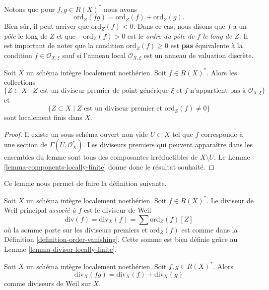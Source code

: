 \noindent
Notons que pour  $f, g \in R(X)^*$  nous avons
$$
\text{ord}_Z(fg) = \text{ord}_Z(f) + \text{ord}_Z(g).
$$
Bien sûr, il peut arriver que  $\text{ord}_Z(f) < 0$. Dans ce cas, nous disons que
 $f$  a un  {\it  pôle}  le long de
 $Z$  et que  $-\text{ord}_Z(f) > 0$  est le  {\it  ordre du pôle de
 $f$  le long de  $Z$}. Il est important de noter que la
condition  $\text{ord}_Z(f) \geq 0$  est  {\bf  pas}  équivalente à
la condition  $f \in \mathcal{O}_{X, \xi}$  sauf si l’anneau local  $\mathcal{O}_{X, \xi}$  est un anneau de
valuation discrète.

\begin{lemma}
\label{lemma-divisor-locally-finite}
Soit  $X$  un schéma intègre localement noethérien. Soit  $f \in R(X)^*$.
Alors les collections
$$
\{Z \subset X \mid Z\text{ est un diviseur premier de point générique }\xi
\text{ et }f\text{ n'appartient pas à }\mathcal{O}_{X, \xi}\}
$$
et
$$
\{Z \subset X \mid Z \text{ est un diviseur premier et }\text{ord}_Z(f) \not = 0\}
$$
sont localement finis dans  $X$.
\end{lemma}

\begin{proof}
Il existe un sous-schéma ouvert non vide  $U \subset X$  tel que  $f$ 
corresponde à une section de  $\Gamma(U, \mathcal{O}_X^*)$. Les diviseurs premiers qui
peuvent apparaître dans les ensembles du lemme sont tous des composantes
irréductibles de  $X \setminus U$. Le Lemme  \ref{lemma-components-locally-finite}  donne donc le résultat
souhaité.
\end{proof}

\noindent
Ce lemme nous permet de faire la définition suivante.

\begin{definition}
\label{definition-principal-divisor}
Soit  $X$  un schéma intègre localement noethérien. Soit  $f \in R(X)^*$. Le
diviseur de Weil principal  {\it  associé à
 $f$}  est le diviseur de Weil
$$
\text{div}(f) = \text{div}_X(f) = \sum \text{ord}_Z(f) [Z]
$$
où la somme porte sur les diviseurs premiers et  $\text{ord}_Z(f)$  est comme dans la
Définition  \ref{definition-order-vanishing}. Cette somme est bien définie grâce au Lemme  \ref{lemma-divisor-locally-finite}.
\end{definition}

\begin{lemma}
\label{lemma-div-additive}
Soit  $X$  un schéma intègre localement noethérien. Soit  $f, g \in R(X)^*$.
Alors
$$
\text{div}_X(fg) = \text{div}_X(f) + \text{div}_X(g)
$$
comme diviseurs de Weil sur  $X$.
\end{lemma}


